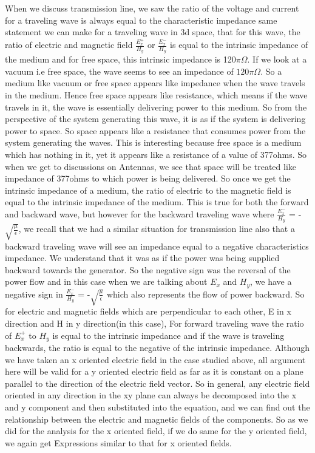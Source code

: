 When we discuss transmission line, we saw the ratio of the voltage and current for a traveling wave is always equal to the characteristic impedance same statement we can make for a traveling wave in 3d space, that for this wave, the ratio of electric and magnetic field $\frac{E_x^{+}}{H_y}$ or $\frac{E_x^{-}}{H_y}$ is equal to the intrinsic impedance of the medium and for free space, this intrinsic impedance is 120$\pi\Omega$. If we look at a vacuum i.e free space, the wave seems to see an impedance of $120\pi\Omega$. So a medium like vacuum or free space appears like impedance when the wave travels in the medium. Hence free space appears like resistance, which means if the wave travels in it, the wave is essentially delivering power to this medium. So from the perspective of the system generating this wave, it is as if the system is delivering power to space. So space appears like a resistance that consumes power from the system generating the waves. This is interesting because free space is a medium which has nothing in it, yet it appears like a resistance of a value of 377ohms. So when we get to discussions on Antennas, we see that space will be treated like impedance of 377ohms to which power is being delivered. So once we get the intrinsic impedance of a medium, the ratio of electric to the magnetic field is equal to the intrinsic impedance of the medium. This is  true for both the forward and backward wave, but however for the backward traveling wave where $\frac{E_x^-}{H_y}$ = - $\sqrt{\frac{\mu}{\epsilon}}$, we recall that we had a similar situation for transmission line also that a backward traveling wave will see an impedance equal to a negative characteristics impedance. We understand that it was as if the power was being supplied backward towards the generator. So the negative sign was the reversal of the power flow and in this case when we are talking about $E_x$ and $H_y$, we have a negative sign in $\frac{E_x^-}{H_y}$ = -$\sqrt{\frac{\mu}{\epsilon}}$ which also represents the flow of power backward. So for electric and magnetic fields which are perpendicular to each other, E in x direction and H in y direction(in this case), For forward traveling wave the ratio of $E_x^+$ to $H_y$ is equal to the intrinsic impedance and if the wave is traveling backwards, the ratio is equal to the negative of the intrinsic impedance.
Although we have taken an x oriented electric field in the case studied above, all argument here will be valid for a y oriented electric field as far as it is constant on a plane parallel  to the direction of the electric field vector. So in general, any electric field oriented in any direction in the xy plane can always be decomposed into the x and y component and then substituted into the equation, and we can find out the relationship between the electric and magnetic fields of the components. So as we did for the analysis for the x oriented field, if we do same for the y oriented field, we again get Expressions similar to that for x oriented fields.

